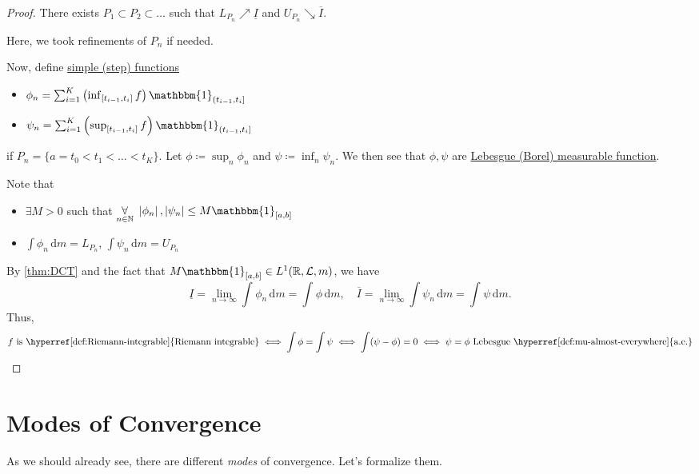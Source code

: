 \begin{proof}
	There exists \(P_1\subset P_2\subset \dots  \) such that \(L_{P_{n}}\nearrow \underline{I} \) and \(U_{P_{n}}\searrow \overline{I} \).
	\begin{note}
		Here, we took refinements of \(P_{n}\) if needed.
	\end{note}
	Now, define \hyperref[def:simple-function]{simple (step) functions}
	\begin{itemize}
		\item \(\phi _{n} = \sum_{i=1}^{K} \left(\inf_{[t_{i-1}, t_{i}]} f \right) \mathbbm{1}_{(t_{i-1}, t_{i}]} \)
		\item \(\psi _{n} = \sum_{i=1}^{K} \left(\sup_{[t_{i-1}, t_{i}]} f \right) \mathbbm{1}_{(t_{i-1}, t_{i}]} \)
	\end{itemize}
	if \(P_{n} = \{a = t_0 < t_1 < \dots < t_{K} \}\). Let \(\phi \coloneqq \sup_n \phi _{n}\) and \(\psi \coloneqq \inf _n \psi _{n}\).
	We then see that \(\phi , \psi \) are \hyperref[def:measurable-function]{Lebesgue (Borel) measurable function}.
	\begin{note}
		Note that
		\begin{itemize}
			\item \(\exists M> 0\) such that \(\underset{n\in\mathbb{N} }{\forall }\ \left\vert \phi _{n} \right\vert, \left\vert \psi _{n} \right\vert \leq M\mathbbm{1}_{[a, b]} \)
			\item \(\int \phi _{n}\,\mathrm{d}m = L_{P_{n}}\), \(\int \psi _{n}\,\mathrm{d}m = U_{P_{n}}\)
		\end{itemize}
	\end{note}
	By \autoref{thm:DCT} and the fact that \(M\mathbbm{1}_{[a, b]} \in L^1(\mathbb{R} , \mathcal{L} , m) \),
	we have
	\[
		\underline{I} = \lim_{n \to \infty} \int_{}^{} \phi _{n} \,\mathrm{d}m = \int_{}^{} \phi  \,\mathrm{d}m,\quad
		\overline{I} = \lim_{n \to \infty} \int \psi _n\,\mathrm{d} m = \int_{}^{} \psi  \,\mathrm{d}m.
	\]
	Thus,
	\[
		f \text{ is \hyperref[def:Riemann-integrable]{Riemann integrable}}
		\iff \int \phi = \int \psi
		\iff \int (\psi - \phi ) = 0
		\iff \psi = \phi \text{ Lebesgue \hyperref[def:mu-almost-everywhere]{a.e.}}
	\]
\end{proof}

\section{Modes of Convergence}
As we should already see, there are different \emph{modes} of convergence. Let's formalize them.

